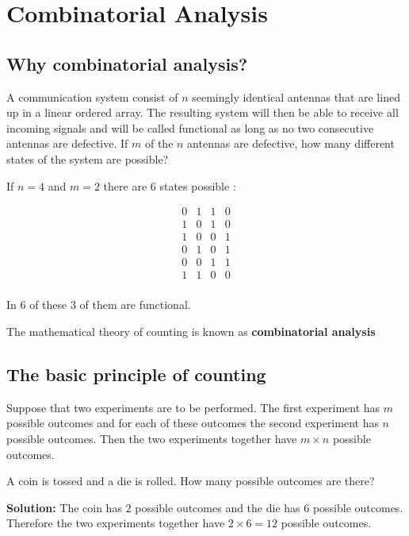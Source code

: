 \chapter{Combinatorial Analysis}

\section{Why combinatorial analysis?}

A communication system consist of \(n\) seemingly identical antennas that are lined up in a linear ordered array. The resulting system will then be able to receive all incoming signals and will be called functional as long as no two consecutive antennas are defective. If \(m\) of the \(n\) antennas are defective, how many different states of the system are possible?

If \(n =4\) and \(m=2\) there are \(6\) states possible : 

\[ 
\begin{matrix}
    0 & 1 & 1 & 0 \\
    1 & 0 & 1 & 0 \\
    1 & 0 & 0 & 1 \\
    0 & 1 & 0 & 1 \\
    0 & 0 & 1 & 1 \\
    1 & 1 & 0 & 0 \\
\end{matrix}
\]

In \(6\) of these \(3\) of them are functional. 

\begin{definition}
    The mathematical theory of counting is known as \textbf{combinatorial analysis}  
\end{definition}

\section{The basic principle of counting}

\begin{definitionbox}[title=The Basic Principle of Counting]
    Suppose that two experiments are to be performed. The first experiment has \(m\) possible outcomes and for each of these outcomes the second experiment has \(n\) possible outcomes. Then the two experiments together have \(m \times n\) possible outcomes.
\end{definitionbox}
\begin{examplebox}[title=Example: Coin and Die]
    A coin is tossed and a die is rolled. How many possible outcomes are there?
    
    \textbf{Solution:} The coin has \(2\) possible outcomes and the die has \(6\) possible outcomes. Therefore the two experiments together have \(2 \times 6 = 12\) possible outcomes.
\end{examplebox}


